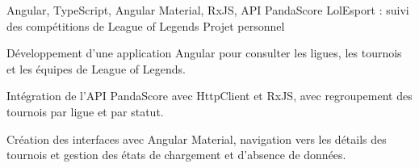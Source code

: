 
\begin{cventries}
  \cventry
    {Angular, TypeScript, Angular Material, RxJS, API PandaScore}
    {LolEsport : suivi des compétitions de League of Legends}
    {Projet personnel}
    {}
    {
      \begin{cvitems}
        \item {Développement d’une application Angular pour consulter les ligues, les tournois et les équipes de League of Legends.}
        \item {Intégration de l’API PandaScore avec HttpClient et RxJS, avec regroupement des tournois par ligue et par statut.}
        \item {Création des interfaces avec Angular Material, navigation vers les détails des tournois et gestion des états de chargement et d’absence de données.}
      \end{cvitems}
    }
\end{cventries}
